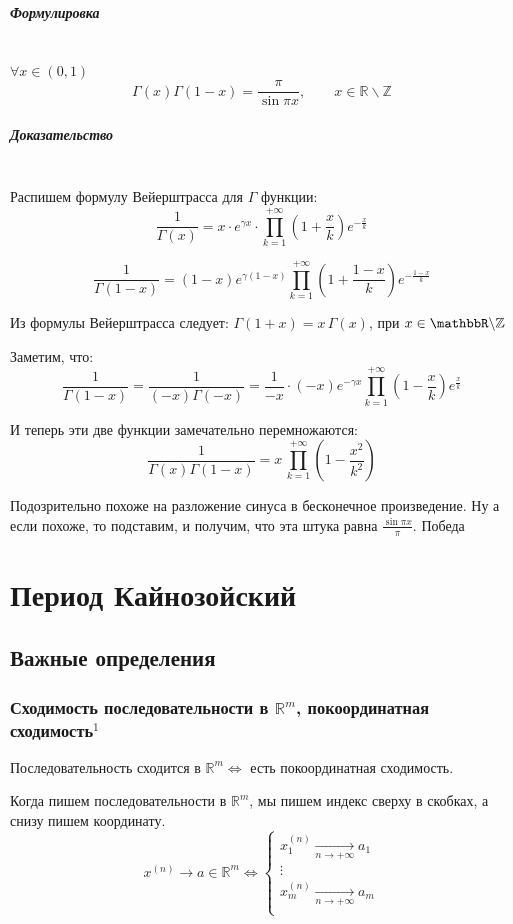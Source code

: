 \documentclass{article}
\let\vanillasubparagraph\subparagraph
\renewcommand{\subparagraph}[1]{\vanillasubparagraph{#1}\mbox{}\\}
\begin{document}
\subparagraph{Формулировка}
$\forall x \in (0, 1)$
$$
\Gamma(x)\Gamma(1-x) = \frac{\pi} {\sin{\pi x}}, \qquad x \in \mathbb R \backslash \mathbb Z
$$

\subparagraph{Доказательство}

Распишем формулу Вейерштрасса для $\Gamma$ функции:
$$
    \frac{1}{\Gamma(x)} = x \cdot e^{\gamma x} \cdot \prod_{k=1}^{+\infty} \left(1 + \frac{x}{k}\right) e^{-\frac{x}{k}}
$$

$$
    \frac{1}{\Gamma{(1 - x)}} = (1-x)e^{\gamma (1-x)} \prod_{k=1}^{+\infty}\left(1 + \frac{1-x}{k}\right)e^{-\frac{1-x}{k}}
$$

Из формулы Вейерштрасса следует: $\Gamma (1 + x) = x\,\Gamma (x)$, при $x \in \mathbbR \backslash \mathbb Z$

Заметим, что: 
$$
\frac{1}{\Gamma(1-x)} = \frac{1}{(-x) \Gamma(-x)}  = \frac{1}{-x} \cdot  (-x) e^{-\gamma x} \prod_{k=1}^{+\infty}\left(1 - \frac{x}{k}\right) e^{\frac{x}{k}}
$$

И теперь эти две функции замечательно перемножаются:
$$
\frac{1}{\Gamma(x)\Gamma(1-x)} = x\, \prod_{k=1}^{+\infty} \left(1 -\frac{x^2}{k^2}\right)
$$

Подозрительно похоже на разложение синуса в бесконечное произведение. Ну а если похоже, то подставим, и получим, что эта штука равна $\frac{\sin{\pi x}}{\pi}$. Победа

\section{Период Кайнозойский}
\subsection{Важные определения}
\subsubsection{Сходимость последовательности в \texorpdfstring{$\mathbb{R}^m$}{R\^m}, покоординатная сходимость\texorpdfstring{$^1$}{}}
Последовательность сходится в $\mathbb{R}^m  \Leftrightarrow$ есть покоординатная сходимость.

Когда пишем последовательности в $\mathbb{R}^m$, мы пишем индекс сверху в скобках, а снизу пишем координату.
$$
x^{(n)} \rightarrow a \in \mathbb{R}^m \Leftrightarrow \left\{\begin{array}{c}
     x^{(n)}_1 \underset{n\rightarrow+\infty}{\longrightarrow} a_1 \\
     \vdots \\
     x^{(n)}_m \underset{n\rightarrow+\infty}{\longrightarrow} a_m \\
\end{array}\right.
$$
\end{document}
